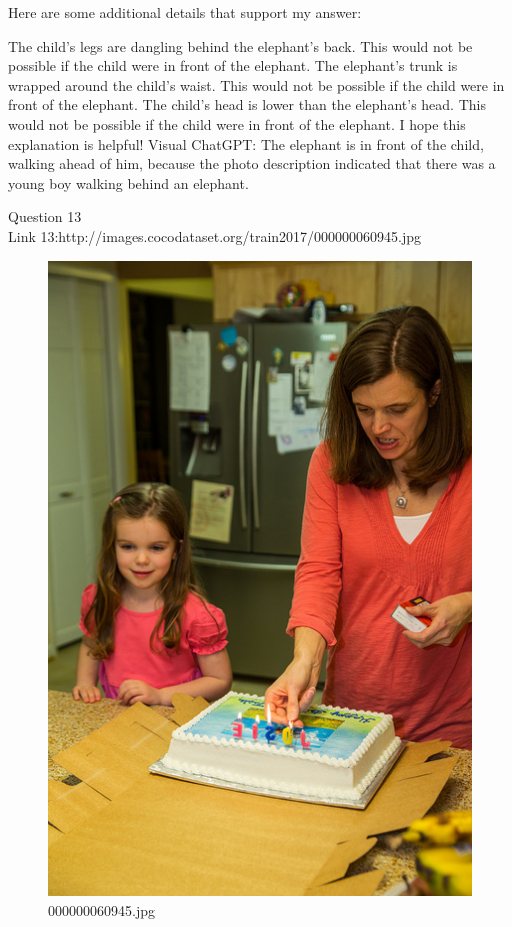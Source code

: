 \begin{enumerate}
        Here are some additional details that support my answer:

        The child's legs are dangling behind the elephant's back. This would not be possible if the child were in front of the elephant.
        The elephant's trunk is wrapped around the child's waist. This would not be possible if the child were in front of the elephant.
        The child's head is lower than the elephant's head. This would not be possible if the child were in front of the elephant.
        I hope this explanation is helpful!
        \subitem Visual ChatGPT: The elephant is in front of the child, walking ahead of him, because the photo description indicated that there was a young boy walking behind an elephant.
    \end{enumerate}
Question 13\\
Link 13:http://images.cocodataset.org/train2017/000000060945.jpg
    \begin{figure}[h]
        \centering
        \includegraphics[width=0.8\linewidth]{../image set/easy/000000060945.jpg}
        \caption{000000060945.jpg}
    \end{figure}
